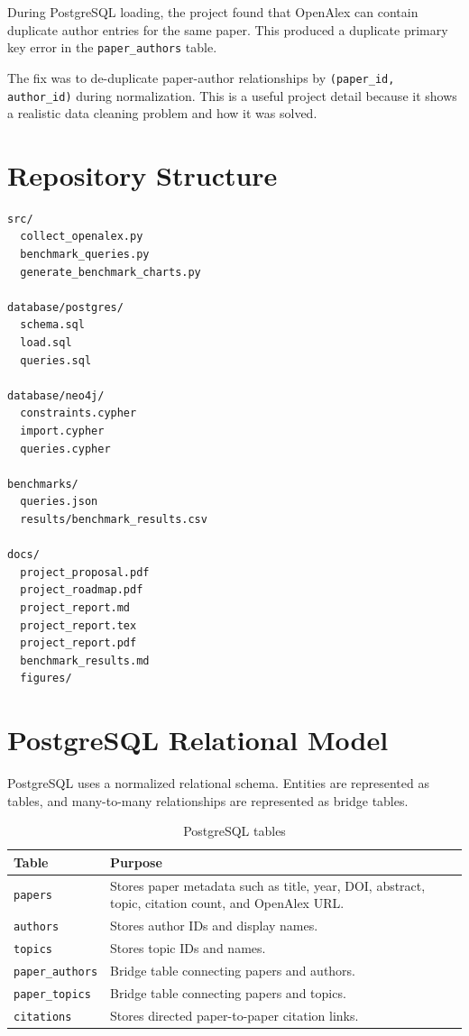 \documentclass[11pt]{article}
\begin{document}
During PostgreSQL loading, the project found that OpenAlex can contain duplicate author entries for the same paper.
This produced a duplicate primary key error in the \texttt{paper\_authors} table.

The fix was to de-duplicate paper-author relationships by \texttt{(paper\_id, author\_id)} during normalization.
This is a useful project detail because it shows a realistic data cleaning problem and how it was solved.

\section{Repository Structure}

\begin{verbatim}
src/
  collect_openalex.py
  benchmark_queries.py
  generate_benchmark_charts.py

database/postgres/
  schema.sql
  load.sql
  queries.sql

database/neo4j/
  constraints.cypher
  import.cypher
  queries.cypher

benchmarks/
  queries.json
  results/benchmark_results.csv

docs/
  project_proposal.pdf
  project_roadmap.pdf
  project_report.md
  project_report.tex
  project_report.pdf
  benchmark_results.md
  figures/
\end{verbatim}

\section{PostgreSQL Relational Model}

PostgreSQL uses a normalized relational schema.
Entities are represented as tables, and many-to-many relationships are represented as bridge tables.

\begin{table}[h]
\centering
\caption{PostgreSQL tables}
\label{tab:postgres-schema}
\begin{tabular}{|p{}|p{}|}
\hline
\textbf{Table} & \textbf{Purpose} \\
\hline
\texttt{papers} & Stores paper metadata such as title, year, DOI, abstract, topic, citation count, and OpenAlex URL. \\
\hline
\texttt{authors} & Stores author IDs and display names. \\
\hline
\texttt{topics} & Stores topic IDs and names. \\
\hline
\texttt{paper\_authors} & Bridge table connecting papers and authors. \\
\hline
\texttt{paper\_topics} & Bridge table connecting papers and topics. \\
\hline
\texttt{citations} & Stores directed paper-to-paper citation links. \\
\hline
\end{tabular}
\end{table}
\end{document}

